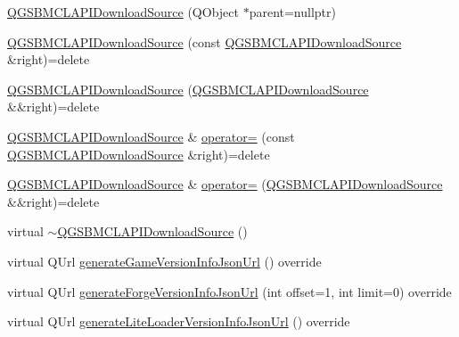\begin{DoxyCompactItemize}
\item 
\mbox{\hyperlink{class_q_g_s_b_m_c_l_a_p_i_download_source_a27e6cedcd65b344fa8d061940d18889f}{Q\+G\+S\+B\+M\+C\+L\+A\+P\+I\+Download\+Source}} (Q\+Object $\ast$parent=nullptr)
\item 
\mbox{\hyperlink{class_q_g_s_b_m_c_l_a_p_i_download_source_ab6c4b9f4095d49305501766bd963fe3b}{Q\+G\+S\+B\+M\+C\+L\+A\+P\+I\+Download\+Source}} (const \mbox{\hyperlink{class_q_g_s_b_m_c_l_a_p_i_download_source}{Q\+G\+S\+B\+M\+C\+L\+A\+P\+I\+Download\+Source}} \&right)=delete
\item 
\mbox{\hyperlink{class_q_g_s_b_m_c_l_a_p_i_download_source_a38c41c6e4275306e2a97408c3c8cbff5}{Q\+G\+S\+B\+M\+C\+L\+A\+P\+I\+Download\+Source}} (\mbox{\hyperlink{class_q_g_s_b_m_c_l_a_p_i_download_source}{Q\+G\+S\+B\+M\+C\+L\+A\+P\+I\+Download\+Source}} \&\&right)=delete
\item 
\mbox{\hyperlink{class_q_g_s_b_m_c_l_a_p_i_download_source}{Q\+G\+S\+B\+M\+C\+L\+A\+P\+I\+Download\+Source}} \& \mbox{\hyperlink{class_q_g_s_b_m_c_l_a_p_i_download_source_a9592b9454a1389d0fbbbe7f1e6a036c8}{operator=}} (const \mbox{\hyperlink{class_q_g_s_b_m_c_l_a_p_i_download_source}{Q\+G\+S\+B\+M\+C\+L\+A\+P\+I\+Download\+Source}} \&right)=delete
\item 
\mbox{\hyperlink{class_q_g_s_b_m_c_l_a_p_i_download_source}{Q\+G\+S\+B\+M\+C\+L\+A\+P\+I\+Download\+Source}} \& \mbox{\hyperlink{class_q_g_s_b_m_c_l_a_p_i_download_source_ad616d04eb51faf150f578d227890cc74}{operator=}} (\mbox{\hyperlink{class_q_g_s_b_m_c_l_a_p_i_download_source}{Q\+G\+S\+B\+M\+C\+L\+A\+P\+I\+Download\+Source}} \&\&right)=delete
\item 
virtual \mbox{\hyperlink{class_q_g_s_b_m_c_l_a_p_i_download_source_a203a7c35947e2f870ab3abb444fe4c80}{$\sim$\+Q\+G\+S\+B\+M\+C\+L\+A\+P\+I\+Download\+Source}} ()
\item 
virtual Q\+Url \mbox{\hyperlink{class_q_g_s_b_m_c_l_a_p_i_download_source_aaff2a6fa2dff1a694dd4562c0469cae2}{generate\+Game\+Version\+Info\+Json\+Url}} () override
\item 
virtual Q\+Url \mbox{\hyperlink{class_q_g_s_b_m_c_l_a_p_i_download_source_a4b503a690cd9d4488bee51def4cad440}{generate\+Forge\+Version\+Info\+Json\+Url}} (int offset=1, int limit=0) override
\item 
virtual Q\+Url \mbox{\hyperlink{class_q_g_s_b_m_c_l_a_p_i_download_source_a8c41976a4494c944c9db91dbd6ff7bb7}{generate\+Lite\+Loader\+Version\+Info\+Json\+Url}} () override
\item 

\end{DoxyCompactItemize}
